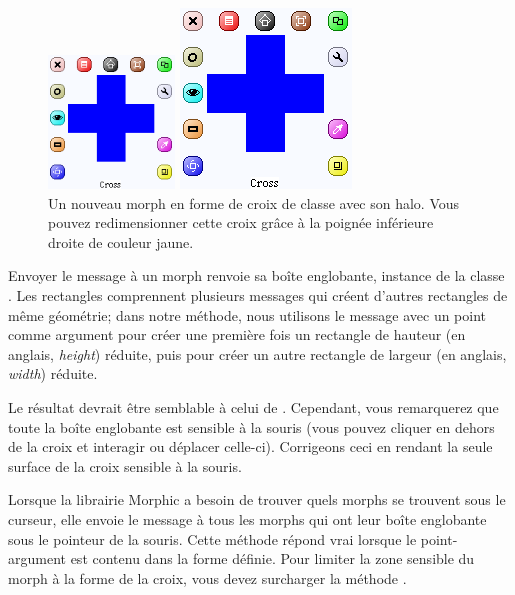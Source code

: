 \documentclass[a4paper,10pt,twoside]{book}
\begin{document}
\begin{figure}[hbt]
	\ifluluelse
		{\centerline{\includegraphics[width=0.3\textwidth]{NewCross}}}
		{\centerline{\includegraphics{NewCross}}}
	\caption{Un nouveau morph en forme de croix de classe
       avec son halo. Vous pouvez redimensionner cette
      croix grâce \`a la poignée inférieure droite
      de couleur jaune.\label{fig:cross}}
\end{figure}

Envoyer le message  \`a un morph renvoie sa
boîte englobante, instance de la classe .  Les
rectangles comprennent plusieurs messages qui créent d'autres
rectangles de même géométrie; %
dans notre méthode, nous utilisons le message  avec un
point comme argument pour créer une première fois un rectangle de
hauteur (en anglais, \emph{height}) réduite, puis pour créer un
autre rectangle de largeur (en anglais, \emph{width}) réduite.

Le résultat devrait être semblable \`a celui de .
Cependant, vous remarquerez que toute la boîte englobante est
sensible \`a la souris (vous pouvez cliquer en dehors de la croix et
interagir ou déplacer celle-ci). Corrigeons ceci en rendant la seule
surface de la croix sensible \`a la souris.

Lorsque la librairie Morphic a besoin de trouver quels morphs se
trouvent sous le curseur, elle envoie le message 
 \`a tous les morphs qui ont leur boîte englobante sous le
pointeur de la souris. 
Cette méthode répond vrai lorsque le point-argument est contenu dans la
forme définie.
Pour limiter la zone sensible du morph \`a la forme de la croix, vous
devez surcharger la méthode .
\end{document}
